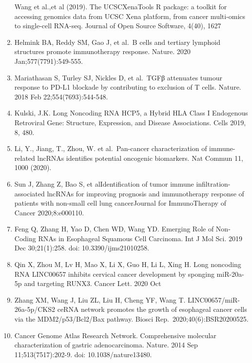 \documentclass[
  12pt,
]{book}
\begin{document}
\begin{enumerate}
  Wang et al.,et al (2019). The UCSCXenaTools R package: a toolkit for accessing genomics data from UCSC Xena platform, from cancer multi-omics to single-cell RNA-seq. Journal of Open Source Software, 4(40), 1627
\item
  Helmink BA, Reddy SM, Gao J, et al.~B cells and tertiary lymphoid structures promote immunotherapy response. Nature. 2020 Jan;577(7791):549-555.
\item
  Mariathasan S, Turley SJ, Nickles D, et al.~TGFβ attenuates tumour response to PD-L1 blockade by contributing to exclusion of T cells. Nature. 2018 Feb 22;554(7693):544-548.
\item
  Kulski, J.K. Long Noncoding RNA HCP5, a Hybrid HLA Class I Endogenous Retroviral Gene: Structure, Expression, and Disease Associations. Cells 2019, 8, 480.
\item
  Li, Y., Jiang, T., Zhou, W. et al.~Pan-cancer characterization of immune-related lncRNAs identifies potential oncogenic biomarkers. Nat Commun 11, 1000 (2020).
\item
  Sun J, Zhang Z, Bao S, et alIdentification of tumor immune infiltration-associated lncRNAs for improving prognosis and immunotherapy response of patients with non-small cell lung cancerJournal for ImmunoTherapy of Cancer 2020;8:e000110.
\item
  Feng Q, Zhang H, Yao D, Chen WD, Wang YD. Emerging Role of Non-Coding RNAs in Esophageal Squamous Cell Carcinoma. Int J Mol Sci. 2019 Dec 30;21(1):258. doi: 10.3390/ijms21010258.
\item
  Qin X, Zhou M, Lv H, Mao X, Li X, Guo H, Li L, Xing H. Long noncoding RNA LINC00657 inhibits cervical cancer development by sponging miR-20a-5p and targeting RUNX3. Cancer Lett. 2020 Oct
\item
  Zhang XM, Wang J, Liu ZL, Liu H, Cheng YF, Wang T. LINC00657/miR-26a-5p/CKS2 ceRNA network promotes the growth of esophageal cancer cells via the MDM2/p53/Bcl2/Bax pathway. Biosci Rep.~2020;40(6):BSR20200525.
\item
  Cancer Genome Atlas Research Network. Comprehensive molecular characterization of gastric adenocarcinoma. Nature. 2014 Sep 11;513(7517):202-9. doi: 10.1038/nature13480.
\end{enumerate}

  
\end{document}
